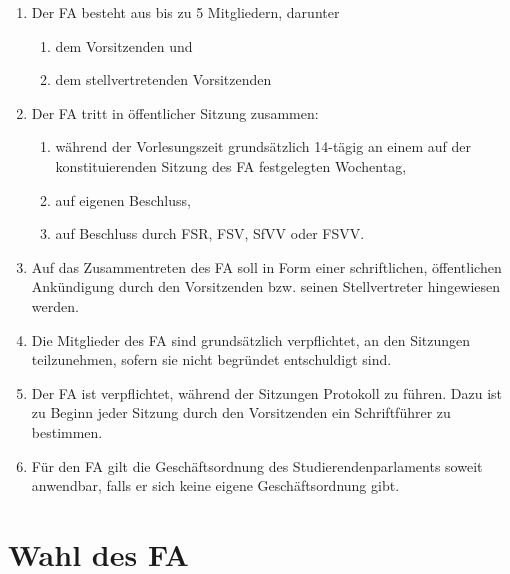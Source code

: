 \documentclass{article}
\begin{document}
\begin{enumerate}[(1)]
	\item Der FA besteht aus bis zu 5 Mitgliedern, darunter
	\begin{enumerate}[1.]
		\item dem Vorsitzenden und
		\item dem stellvertretenden Vorsitzenden
	\end{enumerate}
	\item Der FA tritt in öffentlicher Sitzung zusammen:
	\begin{enumerate}
		\item während der Vorlesungszeit grundsätzlich 14-tägig an einem auf der konstituierenden Sitzung des FA festgelegten Wochentag,
		\item auf eigenen Beschluss,
		\item auf Beschluss durch FSR, FSV, SfVV oder FSVV.
	\end{enumerate}
	\item Auf das Zusammentreten des FA soll in Form einer schriftlichen, öffentlichen Ankündigung durch den Vorsitzenden bzw. seinen Stellvertreter hingewiesen werden.
	\item Die Mitglieder des FA sind grundsätzlich verpflichtet, an den Sitzungen teilzunehmen, sofern sie nicht begründet entschuldigt sind.
	\item Der FA ist verpflichtet, während der Sitzungen Protokoll zu führen. Dazu ist zu Beginn jeder Sitzung durch den Vorsitzenden ein Schriftführer zu bestimmen.
	\item Für den FA gilt die Geschäftsordnung des Studierendenparlaments soweit anwendbar, falls er sich keine eigene Geschäftsordnung gibt.
\end{enumerate}

\section{Wahl des FA}\label{wahl-des-fa}
\end{document}
